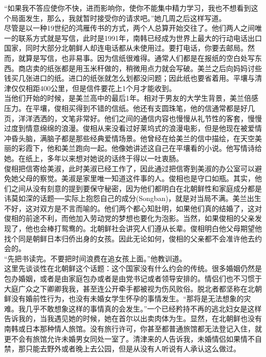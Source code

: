 \begin{multicols}{\theparacolNo}
“如果我不答应使你不快，进而影响你，使你不能集中精力学习，我也不想看到这个局面发生，那么，我就暂时接受你的请求吧。”她几周之后这样写道。\\

尽管是以一种19世纪的鸿雁传书的方式，两个人总算开始交往了。他们两人之间唯一的联系方式就是写信，此时是1991年，南韩已经成为世界上最大的行动电话出口国家，同时大部分北朝鲜人却连电话都从未使用过。要打电话，你要去邮局。然而，就算是写信，也非易事。因为信纸很难得。通常人们都是在报纸的空白处写东西。商店卖的纸张都是用玉米秆做的，稍微用点力就会写破。美兰之后向妈妈讨些钱买几张进口的纸。进口的纸张就怎么划都没问题；因此纸也要省着用。平壤与清津仅仅相距400公里，但是信件要花上1个月才能收到。\\

当他们开始的时候，是美兰高中的最后1年。相对于男友的大学生背景，美兰倍感压力。在平壤，俊相买得到不错的信纸。他还有支圆珠笔，他的信通常都是好几页，洋洋洒洒的，文笔非常好。他们之间的通信内容也慢慢从礼节性的客套，慢慢过度到情意绵绵的浪漫。俊相从来没看过好莱坞式的浪漫电影，但是他现在被爱情冲昏头脑，满脑子都是那些经典爱情场景。他曾经在给美兰的信中描绘，在天空美丽的彩霞下，他和美兰跑向一起。他像她讲述这自己在平壤看的小说。他写情诗给她。在纸上，多年以来想对她说的话终于得以一吐衷肠。\\

俊相把信寄给美淑，此时美淑已经工作了，因此通过把信寄到美淑的办公室可以避免她父母的察觉。美淑是家里唯一知道这件事的人。俊相也是守口如瓶。其实，他们之间从没有刻意的提到要保守秘密，因为他们都明白在北朝鲜性和家庭成分都是讳莫如深的话题──实际上抱怨自己的成分(Songban)，就是对当局不满。美兰出生不好，这对双方是不言而喻的。他们两个都心知肚明，如果他们真的结婚了，这对俊相的前途不利，而他加入劳动党的梦想也要化为泡影。当然，如果俊相的父亲发现了，他也会棒打鸳鸯的。北朝鲜社会讲究人们遵从长辈。俊相明白他父母期望他找个同是朝鲜日本归侨出身的女孩。因此无论如何，俊相的父亲都不会准许他去约会的。\\

“先把书读完。不要把时间浪费在追女孩上面。”他教训道。\\

这里先谈谈性在北朝鲜这个话题：这个国家没有什么约会的传统。很多婚姻仍然是包办婚姻，或者是由家庭包办或者是由党书记或者领导安排的。情侣们也不习惯于大庭广众之下卿卿我我，甚至连公开牵手都被视为伤风败俗。脱北者都坚称在北朝鲜没有婚前性行为，也没有未婚女学生怀孕的事情发生。“那将是无法想象的灾难。我几乎不敢想象这样的事情真的会发生。”一个已经矜持不再的逃北妇女是这样告诉我的，当我遇见她的时候，她在首尔以出卖肉体为生。显然，在北朝鲜也没有南韩或日本那种情人旅馆。没有旅行许可，你甚至都普通旅馆都无法登记入住，就更不会有旅馆允许未婚男女同处一室了。清津来的人告诉我，未婚情侣如果情不自禁，那只能去野外或者晚上去公园，但是从没有人听说有人承认这么做过。\\


\end{multicols}
